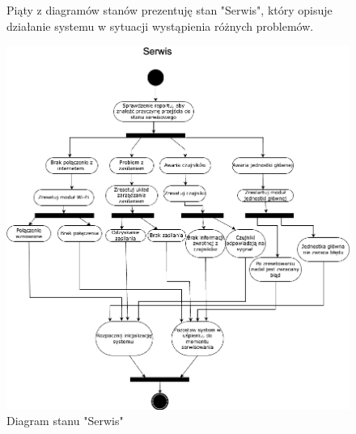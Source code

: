 \documentclass{article}
\begin{document}
\begin{figure}
    \centering
    \begin{minipage}{0.6\textwidth}
        \centering
        \large Piąty z diagramów stanów prezentuję stan "Serwis", który opisuje działanie systemu w sytuacji wystąpienia różnych problemów.
    \end{minipage}
    \includegraphics[scale=0.5]{serwis.png}
    \caption{Diagram stanu "Serwis"}
    \label{etykieta5}
\end{figure}
\end{document}
